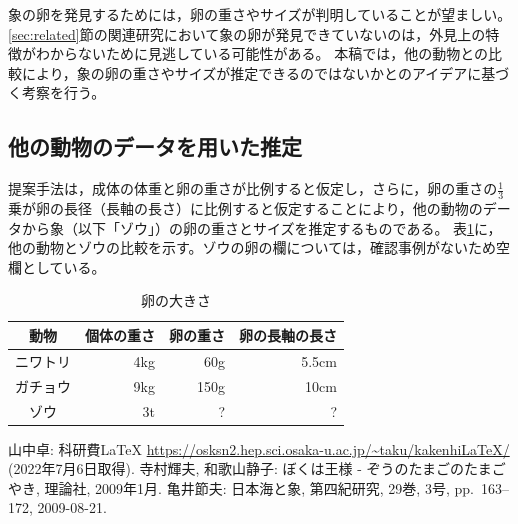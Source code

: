 \documentclass[dvipdfmx]{jsarticle}
\begin{document}
象の卵を発見するためには，卵の重さやサイズが判明していることが望ましい。
\ref{sec:related}節の関連研究\cite{teramura2009}において象の卵が発見できていないのは，外見上の特徴がわからないために見逃している可能性がある。 %
本稿では，他の動物との比較により，象の卵の重さやサイズが推定できるのではないかとのアイデアに基づく考察を行う。

\subsection{他の動物のデータを用いた推定}

提案手法は，成体の体重と卵の重さが比例すると仮定し，さらに，卵の重さの$\frac{1}{3}$乗が卵の長径（長軸の長さ）に比例すると仮定することにより，他の動物のデータから象（以下「ゾウ」）の卵の重さとサイズを推定するものである。
表\ref{tab:egg_sizes}に，他の動物とゾウの比較を示す。ゾウの卵の欄については，確認事例がないため空欄としている。 %

\begin{table}[htbp]
  \centering
  \caption{卵の大きさ}
  \label{tab:egg_sizes} %
  \begin{tabular}{|c|r|r|r|}
    \hline
    動物 & 個体の重さ & 卵の重さ & 卵の長軸の長さ \\ \hline \hline
    ニワトリ & 4kg & 60g & 5.5cm \\ \hline
    ガチョウ & 9kg & 150g & 10cm \\ \hline
    ゾウ & 3t & ? & ? \\ \hline
  \end{tabular}
\end{table}


 {} %
\begin{thebibliography}{99} %
 山中卓: 科研費LaTeX \url{https://osksn2.hep.sci.osaka-u.ac.jp/~taku/kakenhiLaTeX/} (2022年7月6日取得). %
 寺村輝夫, 和歌山静子: ぼくは王様 - ぞうのたまごのたまごやき, 理論社, 2009年1月. %
 亀井節夫: 日本海と象, 第四紀研究, 29巻, 3号, pp.~163--172, 2009-08-21. %
\end{thebibliography}
\end{document}
